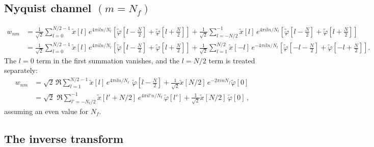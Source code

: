 \documentclass[twocolumn,preprintnumbers,
  superscriptaddress,
  nofootinbib,
  amsmath,
  amssymb,
  aps,
  prd,
  colorlinks=true,
  linkcolor=blue,
  urlcolor=blue,
  citecolor=blue,
  anchorcolor=blue
]{revtex4-2}
\begin{document}
\subsection{Nyquist channel \texorpdfstring{$(m = N_f)$}{(m=N_f)}}

\begin{align}
w_{nm}&=\frac{1}{\sqrt{2}}\sum_{l=0}^{N/2-1} \tilde{x}[l]\, e^{4\pi iln/N_t}\left[\tilde{\varphi}\!\left[l-\tfrac{N}{2}\right]+\tilde{\varphi}\!\left[l+\tfrac{N}{2}\right]\right]+
\frac{1}{\sqrt{2}}\sum_{l=-N/2}^{-1} \tilde{x}[l]\, e^{4\pi iln/N_t}\left[\tilde{\varphi}\!\left[l\!-\!\tfrac{N}{2}\right]+\tilde{\varphi}\!\left[l\!+\!\tfrac{N}{2}\right]\right]\nonumber\\
&=\frac{1}{\sqrt{2}}\sum_{l=0}^{N/2-1} \tilde{x}[l]\, e^{4\pi iln/N_t}\left[\tilde{\varphi}\!\left[l-\tfrac{N}{2}\right]+\tilde{\varphi}\!\left[l+\tfrac{N}{2}\right]\right]+
\frac{1}{\sqrt{2}}\sum_{l=1}^{N/2} \tilde{x}[-l]\, e^{-4\pi iln/N_t}\left[\tilde{\varphi}\!\left[-l\!-\!\tfrac{N}{2}\right]+\tilde{\varphi}\!\left[-l\!+\!\tfrac{N}{2}\right]\right].
\end{align}
%
The $l=0$ term in the first summation vanishes, and the $l=N/2$ term is treated separately:
%
\begin{align}
  w_{nm}&=\sqrt{2}\,\Re\sum_{l=1}^{N/2-1} \tilde{x}[l]\, e^{4\pi
  iln/N_t}\,\,\tilde{\varphi}\!\left[l-\tfrac{N}{2}\right]+\frac{1}{\sqrt{2}}\tilde{x}[N/2]\, e^{-2\pi
  inN_f}\tilde{\varphi}[0]\nonumber\\
  &=\sqrt{2}\,\,\Re\sum_{l'=-N_t/2}^{-1}
  \tilde{x}[l'+N/2]\, e^{4\pi
  il'n/N_t}\,\tilde{\varphi}[l']+\frac{1}{\sqrt{2}}\tilde{x}[N/2]\, \tilde{\varphi}[0]\,,
\end{align}
%
assuming an even value for $N_f$.

\subsection{The inverse transform}\label{app:inverse_transform}
\end{document}
